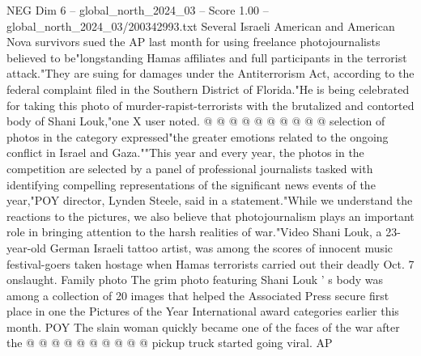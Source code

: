 \begin{textsample}{NEG Dim 6 – global\_north\_2024\_03 – Score 1.00 – global\_north\_2024\_03/200342993.txt}
Several Israeli American and American Nova survivors sued the AP last month for using freelance photojournalists believed to be"longstanding Hamas affiliates and full participants in the terrorist attack."They are suing for damages under the Antiterrorism Act, according to the federal complaint filed in the Southern District of Florida."He is being celebrated for taking this photo of murder-rapist-terrorists with the brutalized and contorted body of Shani Louk,"one X user noted. @ @ @ @ @ @ @ @ @ @ selection of photos in the category expressed"the greater emotions related to the ongoing conflict in Israel and Gaza.""This year and every year, the photos in the competition are selected by a panel of professional journalists tasked with identifying compelling representations of the significant news events of the year,"POY director, Lynden Steele, said in a statement."While we understand the reactions to the pictures, we also believe that photojournalism plays an important role in bringing attention to the harsh realities of war."Video Shani Louk, a 23-year-old German Israeli tattoo artist, was among the scores of innocent music festival-goers taken hostage when Hamas terrorists carried out their deadly Oct. 7 onslaught.
Family photo The grim photo featuring Shani Louk ' s body was among a collection of 20 images that helped the Associated Press secure first place in one the Pictures of the Year International award categories earlier this month.
POY The slain woman quickly became one of the faces of the war after the @ @ @ @ @ @ @ @ @ @ pickup truck started going viral.
AP

\end{textsample}
